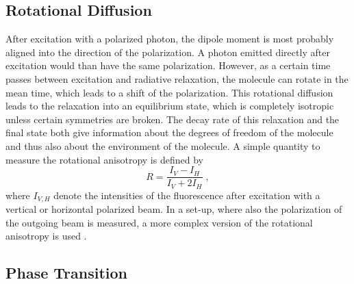\documentclass[draft]{scrartcl}
\numberwithin{equation}{section}
\numberwithin{figure}{section}
\numberwithin{table}{section}
\newcommand{\eq}[2]{\begin{equation}#1\label{#2}\end{equation}}
\begin{document}
\subsection{Rotational Diffusion}
After excitation with a polarized photon, the dipole moment is most probably aligned into the direction of the polarization. A photon emitted directly after excitation would than have the same polarization. However, as a certain time passes between excitation and radiative relaxation, the molecule can rotate in the mean time, which leads to a shift of the polarization. This rotational diffusion leads to the relaxation into an equilibrium state, which is completely isotropic unless certain symmetries are broken. The decay rate of this relaxation and the final state both give information about the degrees of freedom of the molecule and thus also about the environment of the molecule. A simple quantity to measure the rotational anisotropy is defined by
\eq{R=\frac{I_V -I_H}{I_V + 2I_H} \; ,}{R}
where $I_{V,H}$ denote the intensities of the fluorescence after excitation with a vertical or horizontal polarized beam. In a set-up, where also the polarization of the outgoing beam is measured, a more complex version of the rotational anisotropy is used \cite{lako}.

\subsection{Phase Transition}



\clearpage
 

\end{document}
